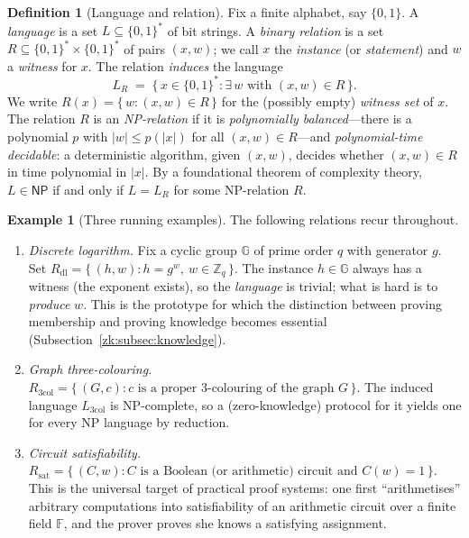 \documentclass[11pt,a4paper]{article}
\theoremstyle{definition}
\newtheorem{definition}[theorem]{Definition}
\newtheorem{example}[theorem]{Example}
\theoremstyle{remark}
\newcommand{\F}{\ensuremath{\mathbb{F}}}
\newcommand{\G}{\ensuremath{\mathbb{G}}}
\begin{document}
\begin{definition}[Language and relation]\label{zk:def:relation}
Fix a finite alphabet, say \(\{0,1\}\). A \emph{language} is a set \(L \subseteq \{0,1\}^*\) of bit strings. A \emph{binary relation} is a set \(R \subseteq \{0,1\}^* \times \{0,1\}^*\) of pairs \((x,w)\); we call \(x\) the \emph{instance} (or \emph{statement}) and \(w\) a \emph{witness} for \(x\). The relation \emph{induces} the language
\[
  L_R \;=\; \{\, x \in \{0,1\}^* : \exists\, w \text{ with } (x,w) \in R \,\}.
\]
We write \(R(x) = \{\, w : (x,w) \in R \,\}\) for the (possibly empty) \emph{witness set} of \(x\). The relation \(R\) is an \emph{\textsf{NP}-relation} if it is \emph{polynomially balanced}---there is a polynomial \(p\) with \(|w| \le p(|x|)\) for all \((x,w)\in R\)---and \emph{polynomial-time decidable}: a deterministic algorithm, given \((x,w)\), decides whether \((x,w)\in R\) in time polynomial in \(|x|\). By a foundational theorem of complexity theory, \(L \in \textsf{NP}\) if and only if \(L = L_R\) for some \textsf{NP}-relation \(R\).
\end{definition}

\begin{example}[Three running examples]\label{zk:exp:relations}
The following relations recur throughout.
\begin{enumerate}
  \item \emph{Discrete logarithm.} Fix a cyclic group \(\G\) of prime order \(q\) with generator \(g\). Set \(R_{\mathrm{dl}} = \{\, (h, w) : h = g^w,\ w \in \mathbb{Z}_q \,\}\). The instance \(h\in\G\) always has a witness (the exponent exists), so the \emph{language} is trivial; what is hard is to \emph{produce} \(w\). This is the prototype for which the distinction between proving membership and proving knowledge becomes essential (Subsection~\ref{zk:subsec:knowledge}).
  \item \emph{Graph three-colouring.} \(R_{\mathrm{3col}} = \{\, (G, c) : c \text{ is a proper } 3\text{-colouring of the graph } G \,\}\). The induced language \(L_{\mathrm{3col}}\) is \textsf{NP}-complete, so a (zero-knowledge) protocol for it yields one for every \textsf{NP} language by reduction.
  \item \emph{Circuit satisfiability.} \(R_{\mathrm{sat}} = \{\, (C, w) : C \text{ is a Boolean (or arithmetic) circuit and } C(w) = 1 \,\}\). This is the universal target of practical proof systems: one first ``arithmetises'' arbitrary computations into satisfiability of an arithmetic circuit over a finite field \(\F\), and the prover proves she knows a satisfying assignment.
\end{enumerate}
\end{example}
\end{document}
